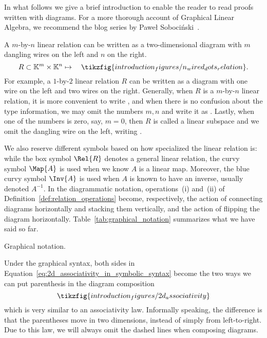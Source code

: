 \documentclass[manyauthors]{fundam}
\def\K{\mathbb{K}}
\begin{document}
In what follows we give a brief introduction
to enable the reader to read proofs written with diagrams.
For a more thorough account of Graphical Linear Algebra,
we recommend the blog series by Pawe{\l} Soboci\'{n}ski~\cite{blogpawel}.

A $m$-by-$n$ linear relation can be written as a two-dimensional diagram with $m$ dangling wires on the left and $n$ on the right.
\begin{equation}
R \subset \K^m \times \K^n \mapsto \quad \tikzfig{introduction_figures/n_wired_dots_relation}.
\end{equation}
For example, a $1$-by-$2$ linear relation $R$ can be written as a diagram  with one wire on the left and two wires on the right. Generally, when $R$ is a $m$-by-$n$ linear relation, it is more convenient to write , and when there is no confusion about the type information, we may omit the numbers $m, n$ and write it as . Lastly, when one of the numbers is zero, say, $m = 0$,  then $R$ is called a linear subspace and we omit the dangling wire on the left, writing .

We also reserve different symbols based on how specialized the linear relation is:
while the box symbol $\Rel{R}$ denotes a general linear relation,
the curvy symbol $\Map{A}$ is used when we know $A$ is a linear map.
Moreover, the blue curvy symbol $\Inv{A}$ is used when $A$ is known to have an inverse,
usually denoted $A^{-1}$.
In the diagrammatic notation, operations~(i) and~(ii) of Definition~\ref{def:relation_operations} become, respectively, the action of connecting diagrams horizontally and stacking them vertically, and the action of flipping the diagram horizontally.
Table~\ref{tab:graphical_notation} summarizes what we have said so far.

\begin{table}[htb]
    \centering
    \caption{Graphical notation.}
    \label{tab:graphical_notation}
\end{table}

Under the graphical syntax, both sides in Equation~\eqref{eq:2d_associativity_in_symbolic_syntax} become the two ways we can put parenthesis in the diagram composition
\begin{equation}
\tikzfig{introduction_figures/2d_associativity}
\end{equation}
which is very similar to an associativity law. Informally speaking, the difference is that the parentheses move in two dimensions, instead of simply from left-to-right. Due to this law, we will always omit the dashed lines when composing diagrams.
\end{document}
